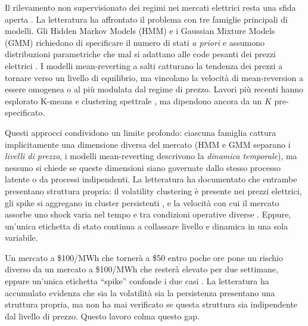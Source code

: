 \documentclass[12pt]{article}
\begin{document}
Il rilevamento non supervisionato dei regimi nei mercati elettrici resta una sfida aperta \citep{weron2014}.
La letteratura ha affrontato il problema con tre famiglie principali di modelli.
Gli Hidden Markov Models (HMM) \citep{mount2006, hamilton1989} e i Gaussian Mixture Models (GMM) \citep{kanamura2009} richiedono di specificare il numero di stati \emph{a priori} e assumono distribuzioni parametriche che mal si adattano alle code pesanti dei prezzi elettrici \citep{bierbrauer2007}.
I modelli mean-reverting a salti \citep{lucia2002, cartea2005} catturano la tendenza dei prezzi a tornare verso un livello di equilibrio, ma vincolano la velocità di mean-reversion a essere omogenea o al più modulata dal regime di prezzo.
Lavori più recenti hanno esplorato K-means e clustering spettrale \citep{rintamaki2017}, ma dipendono ancora da un $K$ pre-specificato.

Questi approcci condividono un limite profondo: ciascuna famiglia cattura implicitamente una dimensione diversa del mercato (HMM e GMM separano i \emph{livelli di prezzo}, i modelli mean-reverting descrivono la \emph{dinamica temporale}), ma nessuno si chiede se queste dimensioni siano governate dallo stesso processo latente o da processi indipendenti.
La letteratura ha documentato che entrambe presentano struttura propria: il volatility clustering \citep{cont2001} è presente nei prezzi elettrici, gli spike si aggregano in cluster persistenti \citep{christensen2009}, e la velocità con cui il mercato assorbe uno shock varia nel tempo e tra condizioni operative diverse \citep{karakatsani2008, knittel2005}.
Eppure, un'unica etichetta di stato continua a collassare livello e dinamica in una sola variabile.

Un mercato a \$100/MWh che tornerà a \$50 entro poche ore pone un rischio diverso da un mercato a \$100/MWh che resterà elevato per due settimane, eppure un'unica etichetta ``spike'' confonde i due casi \citep{huisman2003}.
La letteratura ha accumulato evidenza che sia la volatilità sia la persistenza presentano una struttura propria, ma non ha mai verificato se questa struttura sia indipendente dal livello di prezzo.
Questo lavoro colma questo gap.

\end{document}
